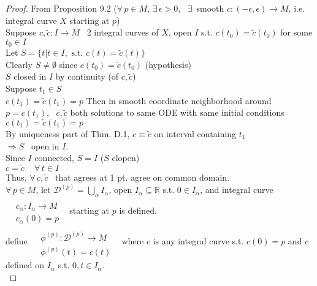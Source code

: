 \begin{proof}
From Proposition 9.2 ($\forall \, p \in M$, $\exists \, \epsilon > 0$, \, $\exists \, $ smooth $c:(-\epsilon, \epsilon) \to M$, i.e. integral curve $X$ starting at $p$) \\

Suppose $c,\widetilde{c} : I \to M$ \, 2 integral curves of $X$, open $I$ s.t. $c(t_0) = \widetilde{c}(t_0)$ for some $t_0 \in I$ \\
Let $S = \lbrace t | t \in I, \text{ s.t. } c(t) = \widetilde{c}(t) \rbrace$ \\
Clearly $S \neq \emptyset$ since $c(t_0) = \widetilde{c}(t_0)$ \quad (hypothesis) \\
\quad $S$ closed in $I$ by continuity (of $c, \widetilde{c}$) \\
Suppose $t_1 \in S$ \\
\quad $c(t_1) = \widetilde{c}(t_1)=p$
Then in smooth coordinate neighborhood around $p=c(t_1)$, \, $c, \widetilde{c}$ both solutions to same ODE with same initial conditions $c(t_1) = \widetilde{c}(t_1) = p$ \\

By uniqueness part of Thm. D.1, $c\equiv \widetilde{c}$ on interval containing $t_1$ \\
\quad $\Longrightarrow S $ \, open in $I$. \\
Since $I$ connected, $S=I$ \quad ($S$ clopen) \\
$c= \widetilde{c} \quad \, \forall \, t \in I$ \\
Thus, $\forall \, c , \widetilde{c}$ \, that agrees at 1 pt. agree on common domain.   \\ 

$\forall \, p \in M$, let $\mathcal{D}^{(p)} = \bigcup_{\alpha} I_{\alpha}$, open $I_{\alpha} \subseteq \mathbb{R}$ 
\quad s.t. $0 \in I_{\alpha}$, and integral curve $\begin{aligned} & \quad \\ 
  & c_{\alpha} : I_{\alpha} \to M \\
  & c_{\alpha}(0) = p \end{aligned}$ \, starting at $p$ is defined.  \\

define $\begin{aligned} & \quad \\ 
  & \phi^{(p)}: \mathcal{D}^{(p)} \to M  \\
  & \phi^{(p)}(t) = c(t) \end{aligned}$ \, where $c$ is any integral curve s.t. $c(0) = p$ and $c$ defined on $I_{\alpha}$ s.t. $0,t \in I_{\alpha}$. \\


\end{proof}
